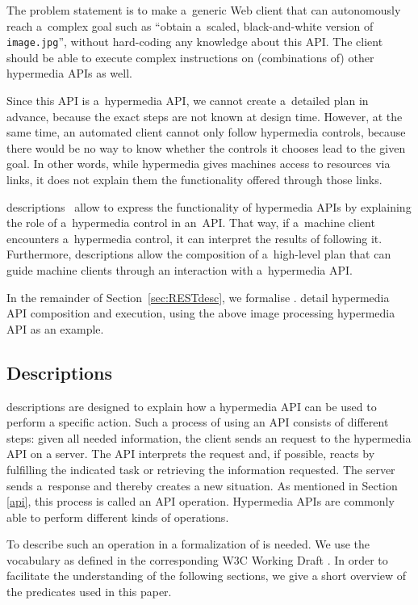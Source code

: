 The problem statement is to make a~generic Web client
that can autonomously reach a~complex goal such as
``obtain a~scaled, black-and-white version of \verb!image.jpg!'',
without hard-coding any knowledge about this API.
The client should be able to execute complex instructions
on (combinations of) other hypermedia APIs as well.

Since this API is a~hypermedia API,
we cannot create a~detailed plan in advance,
because the exact steps are not known at design time.
However, at the same time,
an automated client cannot only follow hypermedia controls,
because there would be no way to know
whether the controls it chooses lead to the given goal.
In other words,
while hypermedia gives machines access to resources via links,
it does not explain them the functionality offered through those links.

\restdesc descriptions~\cite{verborgh_wsrest_2012,verborgh_mtap_2013}
allow to express the functionality of hypermedia APIs
by explaining the role of a~hypermedia control in an~API.
That way, if a~machine client encounters a~hypermedia control,
it can interpret the results of following it.
Furthermore, \restdesc descriptions allow the composition of a~high-level plan
that can guide machine clients through an interaction with a~hypermedia API.

In the remainder of Section~\ref{sec:RESTdesc},
we formalise \restdesc.
 detail hypermedia API composition and execution,
using the above image processing hypermedia API as an example.




\subsection{\restdesc Descriptions}\label{rd}

\restdesc descriptions are designed to explain how a hypermedia API can be used to perform a specific action. 
Such a process of using an API consists of different steps:
given all needed information, the client sends an \http request to the hypermedia API on a server.
The API interprets the request and,
if possible, reacts by fulfilling the indicated task
or retrieving the information requested. The server sends a~response and thereby creates a new situation. As mentioned in Section \ref{api}, this process 
is called an API operation.
Hypermedia APIs are commonly able to perform different kinds of operations.

To describe such an operation in \nthree
a formalization of \http
is needed. 
We use the \rdf vocabulary as defined in the corresponding W3C Working Draft \cite{httprdf}.
In order to facilitate the understanding of the following sections, we give a short overview of the \http predicates used in this paper.

